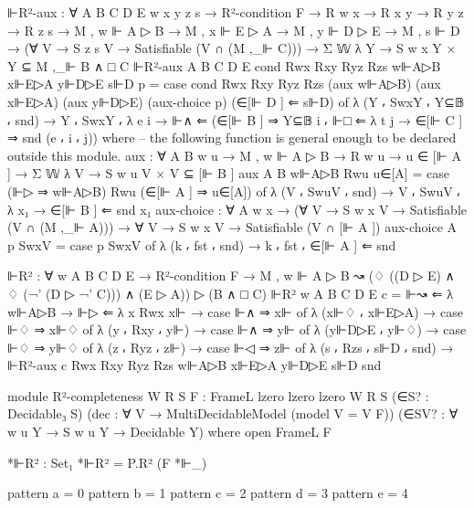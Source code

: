 \begin{spverbatim}
  ⊩R²-aux : ∀ {A B C D E w x y z s}
    → R²-condition F
    → R w x → R x y → R y z → R z s
    → M , w ⊩ A ▷ B
    → M , x ⊩ E ▷ A
    → M , y ⊩ D ▷ E
    → M , s ⊩ D
    → (∀ {V} → S z s V → Satisfiable (V ∩ (M ,_⊩ C)))
    → Σ 𝕎 λ Y → S w x Y × Y ⊆ M ,_⊩ B ∧ □ C
  ⊩R²-aux {A} {B} {C} {D} {E} cond Rwx Rxy Ryz Rzs w⊩A▷B x⊩E▷A y⊩D▷E s⊩D p
    = case cond Rwx Rxy Ryz Rzs
    (aux w⊩A▷B) (aux x⊩E▷A) (aux y⊩D▷E)
    (aux-choice p) (∈[⊩ D ] ⇐ s⊩D) of
    λ { (Y ⸴ SwxY ⸴ Y⊆𝔹 ⸴ snd) → Y ⸴ SwxY ⸴ λ { {e} i → ⊩∧ ⇐ (∈[⊩ B ] ⇒ Y⊆𝔹 i ⸴ ⊩□ ⇐ λ { {t} j → ∈[⊩ C ] ⇒ snd (e ⸴ i ⸴ j)})} }
    where
    -- the following function is general enough to be declared outside this module.
    aux : ∀ {A B w u} → M , w ⊩ A ▷ B → R w u → u ∈ [⊩ A ] → Σ 𝕎 λ V → S w u V × V ⊆ [⊩ B ]
    aux {A} {B} w⊩A▷B Rwu u∈[A] = case (⊩▷ ⇒ w⊩A▷B) Rwu (∈[⊩ A ] ⇒ u∈[A]) of
      λ { (V ⸴ SwuV ⸴ snd) → V ⸴ SwuV ⸴ λ {x₁ → ∈[⊩ B ] ⇐ snd x₁}}
    aux-choice : ∀ {A w x} → (∀ {V} → S w x V → Satisfiable (V ∩ (M ,_⊩ A))) → ∀ {V} → S w x V → Satisfiable (V ∩ [⊩ A ])
    aux-choice {A} p SwxV = case p SwxV of λ { (k ⸴ fst ⸴ snd) → k ⸴ fst ⸴ ∈[⊩ A ] ⇐ snd }

  ⊩R² : ∀ {w A B C D E} → R²-condition F
    → M , w ⊩ A ▷ B ↝ (♢ ((D ▷ E) ∧ ♢ (¬' (D ▷ ¬' C))) ∧ (E ▷ A)) ▷ (B ∧ □ C)
  ⊩R² {w} {A} {B} {C} {D} {E} c = ⊩↝ ⇐ λ {w⊩A▷B → ⊩▷ ⇐
    λ { {x} Rwx x⊩ → case ⊩∧ ⇒ x⊩ of λ { (x⊩♢ ⸴ x⊩E▷A) → case ⊩♢ ⇒ x⊩♢ of
    λ { (y ⸴ Rxy ⸴ y⊩) → case ⊩∧ ⇒ y⊩ of λ { (y⊩D▷E ⸴ y⊩♢) → case ⊩♢ ⇒ y⊩♢ of
    λ { (z ⸴ Ryz ⸴ z⊩) → case ⊩◁ ⇒ z⊩ of λ { (s ⸴ Rzs ⸴ s⊩D ⸴ snd)
    → ⊩R²-aux c Rwx Rxy Ryz Rzs w⊩A▷B x⊩E▷A y⊩D▷E s⊩D snd}}}}}}}

module R²-completeness
  {W R S}
  {F : FrameL {lzero} {lzero} {lzero} W R S}
  (∈S? : Decidable₃ S)
  (dec : ∀ V → MultiDecidableModel (model {V = V} F))
  (∈SV? : ∀ {w u Y} → S w u Y → Decidable Y)
  where
  open FrameL F

  *⊩R² : Set₁
  *⊩R² = P.R² (F *⊩_)

  pattern a = 0
  pattern b = 1
  pattern c = 2
  pattern d = 3
  pattern e = 4



\end{spverbatim}
